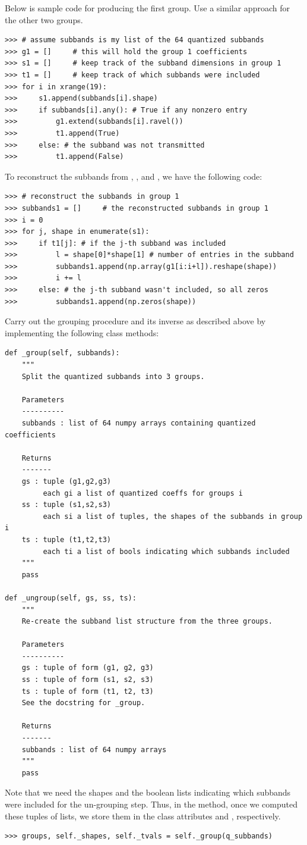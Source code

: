 Below is sample code for producing the first group.
Use a similar approach for the other two groups.
\begin{lstlisting}
>>> # assume subbands is my list of the 64 quantized subbands
>>> g1 = []     # this will hold the group 1 coefficients
>>> s1 = []     # keep track of the subband dimensions in group 1
>>> t1 = []     # keep track of which subbands were included
>>> for i in xrange(19):
>>>     s1.append(subbands[i].shape)
>>>     if subbands[i].any(): # True if any nonzero entry
>>>         g1.extend(subbands[i].ravel())
>>>         t1.append(True)
>>>     else: # the subband was not transmitted
>>>         t1.append(False)
\end{lstlisting}

To reconstruct the subbands from , , and , we have the following code:
\begin{lstlisting}
>>> # reconstruct the subbands in group 1
>>> subbands1 = []     # the reconstructed subbands in group 1
>>> i = 0
>>> for j, shape in enumerate(s1):
>>>     if t1[j]: # if the j-th subband was included
>>>         l = shape[0]*shape[1] # number of entries in the subband
>>>         subbands1.append(np.array(g1[i:i+l]).reshape(shape))
>>>         i += l
>>>     else: # the j-th subband wasn't included, so all zeros
>>>         subbands1.append(np.zeros(shape))
\end{lstlisting}
\begin{problem}
Carry out the grouping procedure and its inverse as described above by implementing
the following class methods:
\begin{lstlisting}
def _group(self, subbands):
    """
    Split the quantized subbands into 3 groups.

    Parameters
    ----------
    subbands : list of 64 numpy arrays containing quantized coefficients

    Returns
    -------
    gs : tuple (g1,g2,g3)
         each gi a list of quantized coeffs for groups i
    ss : tuple (s1,s2,s3)
         each si a list of tuples, the shapes of the subbands in group i
    ts : tuple (t1,t2,t3)
         each ti a list of bools indicating which subbands included
    """
    pass

def _ungroup(self, gs, ss, ts):
    """
    Re-create the subband list structure from the three groups.

    Parameters
    ----------
    gs : tuple of form (g1, g2, g3)
    ss : tuple of form (s1, s2, s3)
    ts : tuple of form (t1, t2, t3)
    See the docstring for _group.

    Returns
    -------
    subbands : list of 64 numpy arrays
    """
    pass
\end{lstlisting}

Note that we need the shapes and the boolean lists indicating which subbands were included
for the un-grouping step.
Thus, in the  method, once we computed these tuples of lists, we store them in the class attributes 
and , respectively.
\begin{lstlisting}
>>> groups, self._shapes, self._tvals = self._group(q_subbands)
\end{lstlisting}
\end{problem}

